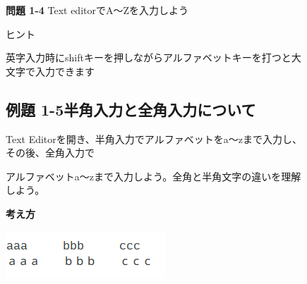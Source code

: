 \documentclass[a4paper,12pt]{jarticle}
\begin{document}
\begin{figure}[ht]
  \flushleft
  {\bfseries 問題 1-4}
  Text editorでA〜Zを入力しよう

  ヒント

  英字入力時にshiftキーを押しながらアルファベットキーを打つと大文字で入力できます
\end{figure}
\clearpage
\begin{figure}[ht]
  \subsection{例題
    1-5半角入力と全角入力について}
  Text
  Editorを開き、半角入力でアルファベットをa〜zまで入力し、その後、全角入力で

  アルファベットa〜zまで入力しよう。全角と半角文字の違いを理解しよう。

  {\bf\large 考え方}

  \centering
  \includegraphics[width=5.978cm,height=1.773cm]{textbook-img066.png}

  \begin{minipage}{16.578cm}

    \bigskip


\end{minipage}
\end{figure}
\end{document}
